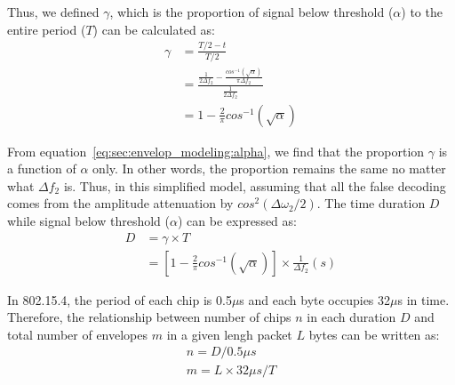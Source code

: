 Thus, we defined $\gamma$, which is the proportion of signal below threshold ($\alpha$) to the entire 
period ($T$) can be calculated as:
\begin{align}
\gamma 	&= \tfrac{T/2-t}{T/2}	\\
		&= \tfrac{\tfrac{1}{2\Delta f_2} - \tfrac{cos^{-1}(\sqrt{\alpha})}{\pi\Delta f_2}}{\tfrac{1}{2\Delta f_2}}	\\
		&= 1 - \tfrac{2}{\pi}cos^{-1}(\sqrt{\alpha})
		\label{eq:sec:envelop_modeling:alpha}
\end{align}

From equation~\ref{eq:sec:envelop_modeling:alpha}, we find that the proportion $\gamma$ is a function
of $\alpha$ only. In other words, the proportion remains the same no matter what $\Delta f_2$ is.
Thus, in this simplified model, assuming that all the false decoding comes from the amplitude
attenuation by $cos^2(\Delta\omega_2/2)$. The time duration $D$ while signal below threshold ($\alpha$)
can be expressed as:
\begin{align}
D 	&= \gamma \times T\\
	&= \left[1 - \tfrac{2}{\pi}cos^{-1}(\sqrt{\alpha})\right]\times\tfrac{1}{\Delta f_2} (s)
\end{align}

In 802.15.4, the period of each chip is 0.5$\mu$s and each byte occupies 32$\mu$s in time. Therefore, the
relationship between number of chips $n$ in each duration $D$ and total number of envelopes $m$ in 
a given lengh packet $L$ bytes can be written as:
\begin{eqnarray}
n = D/0.5\mu s \\
m = L\times 32\mu s/T
\end{eqnarray}

